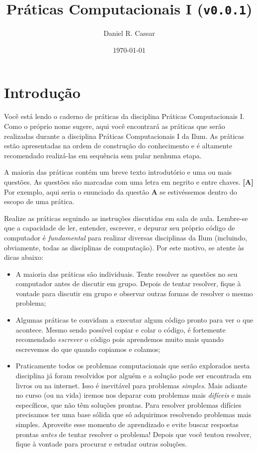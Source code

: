 \documentclass[11pt]{article}
\author{Daniel R. Cassar}
\date{\today}
\title{Práticas Computacionais I (\texttt{v0.0.1})}
\begin{document}
\maketitle
\tableofcontents



\section{Introdução}
\label{sec:orgdef7317}
Você está lendo o caderno de práticas da disciplina Práticas Computacionais I. Como o próprio nome sugere, aqui você encontrará as práticas que serão realizadas durante a disciplina Práticas Computacionais I da Ilum. As práticas estão apresentadas na ordem de construção do conhecimento e é altamente recomendado realizá-las em sequência sem pular nenhuma etapa.

A maioria das práticas contém um breve texto introdutório e uma ou mais questões. As questões são marcadas com uma letra em negrito e entre chaves. \textbf{[A]} Por exemplo, aqui seria o enunciado da questão \textbf{A} se estivéssemos dentro do escopo de uma prática.

Realize as práticas seguindo as instruções discutidas em sala de aula. Lembre-se que a capacidade de ler, entender, escrever, e depurar seu próprio código de computador é \emph{fundamental} para realizar diversas disciplinas da Ilum (incluindo, obviamente, todas as disciplinas de computação). Por este motivo, se atente às dicas abaixo:

\begin{itemize}
\item A maioria das práticas são individuais. Tente resolver as questões no seu computador antes de discutir em grupo. Depois de tentar resolver, fique à vontade para discutir em grupo e observar outras formas de resolver o mesmo problema;

\item Algumas práticas te convidam a executar algum código pronto para ver o que acontece. Mesmo sendo possível copiar e colar o código, é fortemente recomendado \emph{escrever} o código pois aprendemos muito mais quando escrevemos do que quando copiamos e colamos;

\item Praticamente todos os problemas computacionais que serão explorados nesta disciplina já foram resolvidos por alguém e a solução pode ser encontrada em livros ou na internet. Isso é inevitável para problemas \emph{simples}. Mais adiante no curso (ou na vida) iremos nos deparar com problemas mais \emph{difíceis} e mais específicos, que não têm soluções prontas. Para resolver problemas difícies precisamos ter uma base sólida que só adquirimos resolvendo problemas mais simples. Aproveite esse momento de aprendizado e evite buscar respostas prontas \emph{antes} de tentar resolver o problema! Depois que você tentou resolver, fique à vontade para procurar e estudar outras soluções.
\end{itemize}
\end{document}
